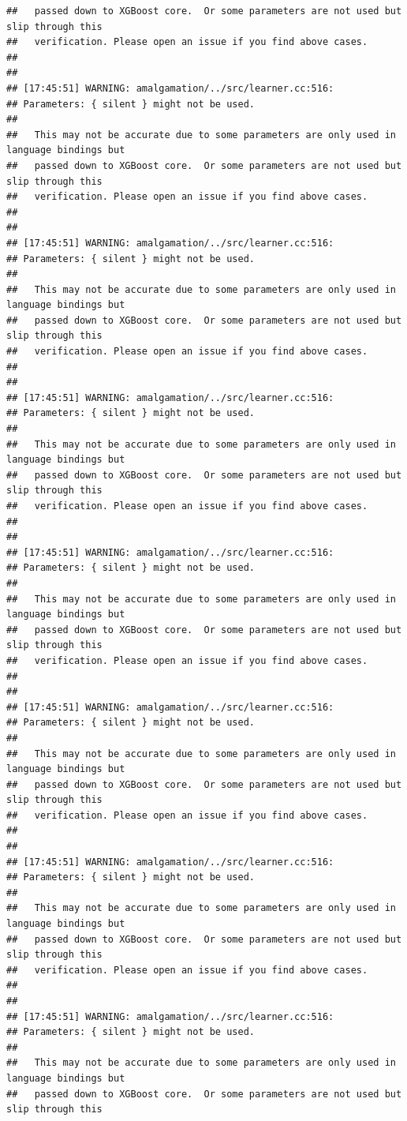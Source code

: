 \documentclass[AMS,STIX2COL]{WileyNJD-v2}\usepackage[]{graphicx}\usepackage[]{color}
\makeatletter
\newenvironment{kframe}{%
 \def\at@end@of@kframe{}%
 \ifinner\ifhmode%
  \def\at@end@of@kframe{\end{minipage}}%
  \begin{minipage}{\columnwidth}%
 \fi\fi%
 \def\FrameCommand##1{\hskip\@totalleftmargin \hskip-\fboxsep
 \colorbox{shadecolor}{##1}\hskip-\fboxsep
     \hskip-\linewidth \hskip-\@totalleftmargin \hskip\columnwidth}%
 \MakeFramed {\advance\hsize-\width
   \@totalleftmargin\z@ \linewidth\hsize
   \@setminipage}}%
 {\par\unskip\endMakeFramed%
 \at@end@of@kframe}
\newenvironment{knitrout}{}{} %
\makeatother
\begin{document}
\begin{knitrout}
\begin{kframe}
\begin{verbatim}
##   passed down to XGBoost core.  Or some parameters are not used but slip through this
##   verification. Please open an issue if you find above cases.
## 
## 
## [17:45:51] WARNING: amalgamation/../src/learner.cc:516: 
## Parameters: { silent } might not be used.
## 
##   This may not be accurate due to some parameters are only used in language bindings but
##   passed down to XGBoost core.  Or some parameters are not used but slip through this
##   verification. Please open an issue if you find above cases.
## 
## 
## [17:45:51] WARNING: amalgamation/../src/learner.cc:516: 
## Parameters: { silent } might not be used.
## 
##   This may not be accurate due to some parameters are only used in language bindings but
##   passed down to XGBoost core.  Or some parameters are not used but slip through this
##   verification. Please open an issue if you find above cases.
## 
## 
## [17:45:51] WARNING: amalgamation/../src/learner.cc:516: 
## Parameters: { silent } might not be used.
## 
##   This may not be accurate due to some parameters are only used in language bindings but
##   passed down to XGBoost core.  Or some parameters are not used but slip through this
##   verification. Please open an issue if you find above cases.
## 
## 
## [17:45:51] WARNING: amalgamation/../src/learner.cc:516: 
## Parameters: { silent } might not be used.
## 
##   This may not be accurate due to some parameters are only used in language bindings but
##   passed down to XGBoost core.  Or some parameters are not used but slip through this
##   verification. Please open an issue if you find above cases.
## 
## 
## [17:45:51] WARNING: amalgamation/../src/learner.cc:516: 
## Parameters: { silent } might not be used.
## 
##   This may not be accurate due to some parameters are only used in language bindings but
##   passed down to XGBoost core.  Or some parameters are not used but slip through this
##   verification. Please open an issue if you find above cases.
## 
## 
## [17:45:51] WARNING: amalgamation/../src/learner.cc:516: 
## Parameters: { silent } might not be used.
## 
##   This may not be accurate due to some parameters are only used in language bindings but
##   passed down to XGBoost core.  Or some parameters are not used but slip through this
##   verification. Please open an issue if you find above cases.
## 
## 
## [17:45:51] WARNING: amalgamation/../src/learner.cc:516: 
## Parameters: { silent } might not be used.
## 
##   This may not be accurate due to some parameters are only used in language bindings but
##   passed down to XGBoost core.  Or some parameters are not used but slip through this

\end{verbatim}
\end{kframe}
\end{knitrout}
\end{document}
